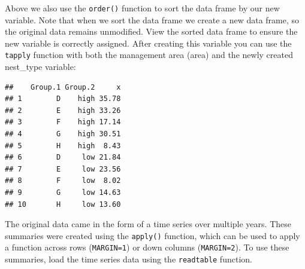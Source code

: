 \documentclass[
]{book}
\newenvironment{Shaded}{\begin{snugshade}}{\end{snugshade}}
\newcommand{\AttributeTok}[1]{\textcolor[rgb]{0.13,0.29,0.53}{#1}}
\newcommand{\CommentTok}[1]{\textcolor[rgb]{0.56,0.35,0.01}{\textit{#1}}}
\newcommand{\FloatTok}[1]{\textcolor[rgb]{0.00,0.00,0.81}{#1}}
\newcommand{\FunctionTok}[1]{\textcolor[rgb]{0.13,0.29,0.53}{\textbf{#1}}}
\newcommand{\NormalTok}[1]{#1}
\newcommand{\OtherTok}[1]{\textcolor[rgb]{0.56,0.35,0.01}{#1}}
\newcommand{\SpecialCharTok}[1]{\textcolor[rgb]{0.81,0.36,0.00}{\textbf{#1}}}
\newcommand{\StringTok}[1]{\textcolor[rgb]{0.31,0.60,0.02}{#1}}
\begin{document}
\begin{Shaded}
\end{Shaded}

Above we also use the \texttt{order()} function to sort the data frame by our new variable. Note that when we sort the data frame we create a new data frame, so the original data remains unmodified. View the sorted data frame to ensure the new variable is correctly assigned. After creating this variable you can use the \texttt{tapply} function with both the management area (area) and the newly created nest\_type variable:

\begin{Shaded}
\end{Shaded}

\begin{verbatim}
##    Group.1 Group.2     x
## 1        D    high 35.78
## 2        E    high 33.26
## 3        F    high 17.14
## 4        G    high 30.51
## 5        H    high  8.43
## 6        D     low 21.84
## 7        E     low 23.56
## 8        F     low  8.02
## 9        G     low 14.63
## 10       H     low 13.60
\end{verbatim}

The original data came in the form of a time series over multiple years. These summaries were created using the \texttt{apply()} function, which can be used to apply a function across rows (\texttt{MARGIN=1}) or down columns (\texttt{MARGIN=2}). To use these summaries, load the time series data using the \texttt{readtable} function.
\end{document}
